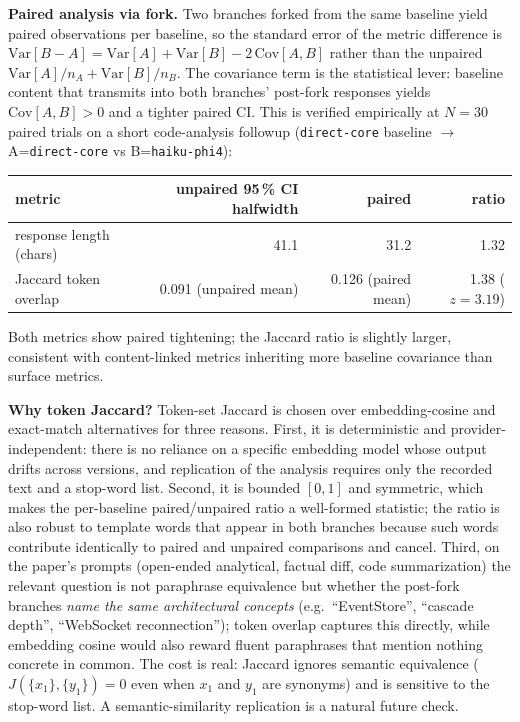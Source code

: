 \documentclass[11pt,a4paper]{article}
\begin{document}
\textbf{Paired analysis via fork.} Two branches forked from the
same baseline yield paired observations per baseline, so the
standard error of the metric difference is
$\mathrm{Var}[B-A] = \mathrm{Var}[A] + \mathrm{Var}[B] - 2\,\mathrm{Cov}[A,B]$
rather than the unpaired
$\mathrm{Var}[A]/n_A + \mathrm{Var}[B]/n_B$. The covariance
term is the statistical lever: baseline content that transmits
into both branches' post-fork responses yields
$\mathrm{Cov}[A,B] > 0$ and a tighter paired CI. This is
verified empirically at $N=30$ paired trials on a short
code-analysis followup (\texttt{direct-core} baseline $\to$
A=\texttt{direct-core} vs B=\texttt{haiku-phi4}):

\begin{table}[H]
\centering\small
\begin{tabular}{l r r r}
\toprule
metric & unpaired 95\,\% CI halfwidth & paired & ratio \\
\midrule
response length (chars) & 41.1 & 31.2 & 1.32 \\
Jaccard token overlap   & 0.091 (unpaired mean) & 0.126 (paired mean) & 1.38 ($z=3.19$) \\
\bottomrule
\end{tabular}
\end{table}

Both metrics show paired tightening; the Jaccard ratio is
slightly larger, consistent with content-linked metrics
inheriting more baseline covariance than surface metrics.

\textbf{Why token Jaccard?} Token-set Jaccard is chosen over
embedding-cosine and exact-match alternatives for three reasons.
First, it is deterministic and provider-independent: there is no
reliance on a specific embedding model whose output drifts across
versions, and replication of the analysis requires only the
recorded text and a stop-word list. Second, it is bounded $[0,1]$
and symmetric, which makes the per-baseline paired/unpaired ratio
a well-formed statistic; the ratio is also robust to template
words that appear in both branches because such words contribute
identically to paired and unpaired comparisons and cancel.
Third, on the paper's prompts (open-ended analytical, factual
diff, code summarization) the relevant question is not paraphrase
equivalence but whether the post-fork branches \emph{name the
same architectural concepts} (e.g.\ ``EventStore'', ``cascade
depth'', ``WebSocket reconnection''); token overlap captures this
directly, while embedding cosine would also reward fluent
paraphrases that mention nothing concrete in common. The cost is
real: Jaccard ignores semantic equivalence ($J(\{x_1\}, \{y_1\})
= 0$ even when $x_1$ and $y_1$ are synonyms) and is sensitive to
the stop-word list. A semantic-similarity replication is a
natural future check.
\end{document}
